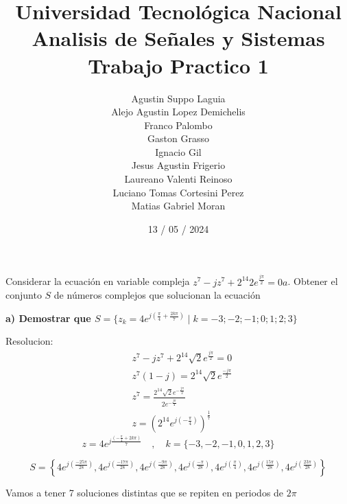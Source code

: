 \documentclass[12pt]{report}
\title{%
  \fontsize{25}{0}\selectfont Universidad Tecnológica Nacional \\
  \fontsize{22}{30}\selectfont Analisis de Señales y Sistemas \\
  \fontsize{20}{25}\selectfont Trabajo Practico 1
}
\author{
Agustin Suppo Laguia\\
Alejo Agustin Lopez Demichelis\\
Franco Palombo\\
Gaston Grasso\\
Ignacio Gil\\
Jesus Agustin Frigerio\\
Laureano Valenti Reinoso\\
Luciano Tomas Cortesini Perez\\
Matias Gabriel Moran\\
}
\date{13 / 05 / 2024}
\begin{document}
\maketitle

\chapter{}%
Considerar la ecuación en variable compleja $z^7-jz^7+2^{14}2e^{\frac{j\pi}{2}}=0a$. 
Obtener el conjunto $S$ de números complejos que solucionan la ecuación

\textbf{a) Demostrar que  $S = \{z_k = 4e^{j(\frac{\pi}{4}+\frac{2k\pi}{7})} \mid k=-3;-2;-1;0;1;2;3\}$}

Resolucion:
\begin{align*}
&z^7 - jz^7 + 2^{14}\sqrt{2}e^{\frac{j\pi}{2}} = 0\\
&z^7(1-j) = 2^{14}\sqrt{2}e^{\frac{-j\pi}{2}}\\
&z^7 = \frac{2^{14}\sqrt{2}e^{-\frac{j\pi}{2}}} {2e^{-\frac{j\pi}{4}}}\\
&z = (2^{14}e^{j(-\frac{\pi} {4})})^{\frac{1}{7}}
\end{align*}
$$z = 4e^{j\frac{(-\frac{\pi}{4}+2k\pi)}{7}} \quad,\quad k = \{-3,-2,-1,0,1,2,3\}$$

$$
S = \left\{ 4e^{j \left( \frac{-25 \pi}{28} \right)}, 4e^{j \left( \frac{-17 \pi}{28} \right)}, 4e^{j \left( \frac{-9 \pi}{28} \right)}, 4e^{j \left( \frac{-\pi}{28} \right)}, 4e^{j \left( \frac{\pi}{4} \right)}, 4e^{j \left( \frac{15 \pi}{28} \right)}, 4e^{j \left( \frac{23 \pi}{28} \right)} \right\}
$$

Vamos a tener 7 soluciones distintas que se repiten en periodos de $2\pi$\\
\end{document}
